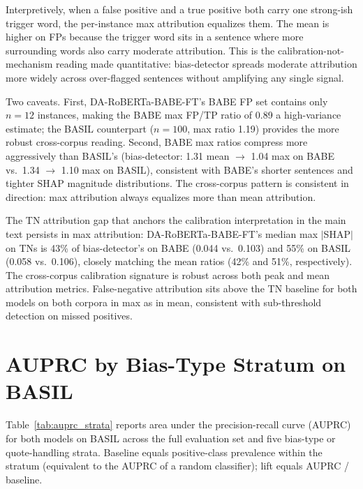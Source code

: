 \documentclass[11pt]{article}
\begin{document}
Interpretively, when a false positive and a true positive both carry 
one strong-ish trigger word, the per-instance max attribution 
equalizes them. The mean is higher on FPs because the trigger word 
sits in a sentence where more surrounding words also carry moderate 
attribution. This is the calibration-not-mechanism reading made 
quantitative: bias-detector spreads moderate attribution more widely 
across over-flagged sentences without amplifying any single signal.

Two caveats. First, DA-RoBERTa-BABE-FT's BABE FP set contains only 
$n=12$ instances, making the BABE max FP/TP ratio of 0.89 a 
high-variance estimate; the BASIL counterpart ($n=100$, max ratio 
1.19) provides the more robust cross-corpus reading. Second, BABE 
max ratios compress more aggressively than BASIL's (bias-detector: 
1.31 mean $\to$ 1.04 max on BABE vs.\ 1.34 $\to$ 1.10 max on BASIL), 
consistent with BABE's shorter sentences and tighter SHAP magnitude 
distributions. The cross-corpus pattern is consistent in direction: 
max attribution always equalizes more than mean attribution.

The TN attribution gap that anchors the calibration interpretation in 
the main text persists in max attribution: DA-RoBERTa-BABE-FT's 
median max $|$SHAP$|$ on TNs is 43\% of bias-detector's on BABE 
(0.044 vs.\ 0.103) and 55\% on BASIL (0.058 vs.\ 0.106), closely 
matching the mean ratios (42\% and 51\%, respectively). The 
cross-corpus calibration signature is robust across both peak and 
mean attribution metrics. False-negative attribution sits above the 
TN baseline for both models on both corpora in max as in mean, 
consistent with sub-threshold detection on missed positives.

\section{AUPRC by Bias-Type Stratum on BASIL}
\label{app:auprc_strata}

Table~\ref{tab:auprc_strata} reports area under the precision-recall 
curve (AUPRC) for both models on BASIL across the full evaluation set 
and five bias-type or quote-handling strata. Baseline equals 
positive-class prevalence within the stratum (equivalent to the AUPRC 
of a random classifier); lift equals AUPRC / baseline.
\end{document}
